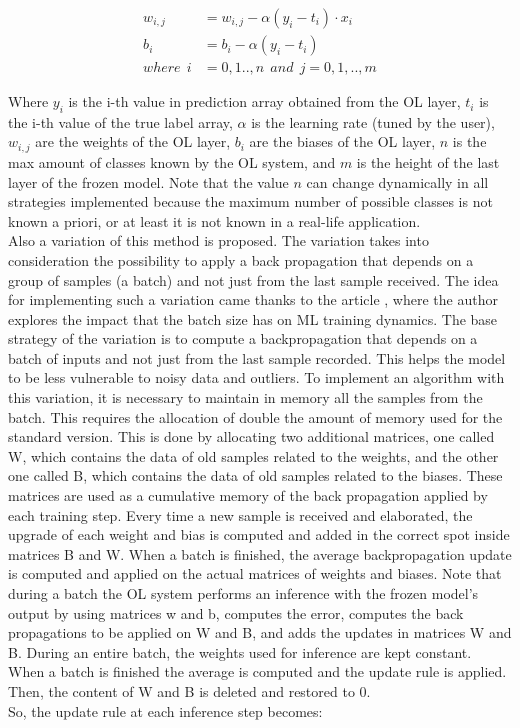 \documentclass[12pt]{report}
\begin{document}
\begin{align}
    w_{i,j} &= w_{i,j} - \alpha (y_i - t_i) \cdot x_i \\
    b_i     &= b_i - \alpha (y_i - t_i) \\
    where \:\: i &= 0,1..,n  \: \: and \: \:  j=0,1,..,m \nonumber 
\end{align}

Where $y_i$ is the i-th value in prediction array obtained from the OL layer, $t_i$ is the i-th value of the true label array, $\alpha$ is the learning rate (tuned by the user), $w_{i,j}$ are the weights of the OL layer, $b_i$ are the biases of the OL layer, $n$ is the max amount of classes known by the OL system, and $m$ is the height of the last layer of the frozen model. Note that the value $n$ can change dynamically in all strategies implemented because the maximum number of possible classes is not known a priori, or at least it is not known in a real-life application. \\
Also a variation of this method is proposed. The variation takes into consideration the possibility to apply a back propagation that depends on a group of samples (a batch) and not just from the last sample received. The idea for implementing such a variation came thanks to the article \cite{batch_size_medium}, where the author explores the impact that the batch size has on ML training dynamics. The base strategy of the variation is to compute a backpropagation that depends on a batch of inputs and not just from the last sample recorded. This helps the model to be less vulnerable to noisy data and outliers. To implement an algorithm with this variation, it is necessary to maintain in memory all the samples from the batch. This requires the allocation of double the amount of memory used for the standard version. This is done by allocating two additional matrices, one called W, which contains the data of old samples related to the weights, and the other one called B, which contains the data of old samples related to the biases. These matrices are used as a cumulative memory of the back propagation applied by each training step. Every time a new sample is received and elaborated, the upgrade of each weight and bias is computed and added in the correct spot inside matrices B and W. When a batch is finished, the average backpropagation update is computed and applied on the actual matrices of weights and biases. Note that during a batch the OL system performs an inference with the frozen model's output by using matrices w and b, computes the error, computes the back propagations to be applied on W and B, and adds the updates in matrices W and B. During an entire batch, the weights used for inference are kept constant. When a batch is finished the average is computed and the update rule is applied. Then, the content of W and B is deleted and restored to 0. \\
So, the update rule at each inference step becomes:
\end{document}
